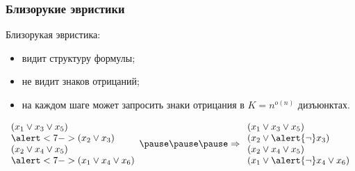 \begin{frame}
	\frametitle{Близорукие эвристики}
    \pause
    
    \begin{definition}
        Близорукая эвристика:
        \pause
        \begin{itemize}
	        \item видит структуру формулы;
        	\pause
        	\item не видит знаков отрицаний;
        	\item<6-> на каждом шаге может запросить знаки отрицания в
        		$K = n^{o(n)}$ дизъюнктах.
        \end{itemize}
    \end{definition}

    \pause
    $\begin{array}{l}
        (x_1 \vee x_3 \vee x_5) \\
        \alert<7->{(x_2 \vee x_3)} \\
        (x_2 \vee x_4 \vee x_5) \\
        \alert<7->{(x_1 \vee x_4 \vee x_6)} \\
    \end{array}
    \pause
    \pause
    \pause
    \Rightarrow
    \begin{array}{l}
        (x_1 \vee x_3 \vee x_5) \\
        (x_2 \vee \alert{\neg} x_3) \\
        (x_2 \vee x_4 \vee x_5) \\
        (x_1 \vee \alert{\neg} x_4 \vee x_6) \\
    \end{array}$
    
\end{frame}

